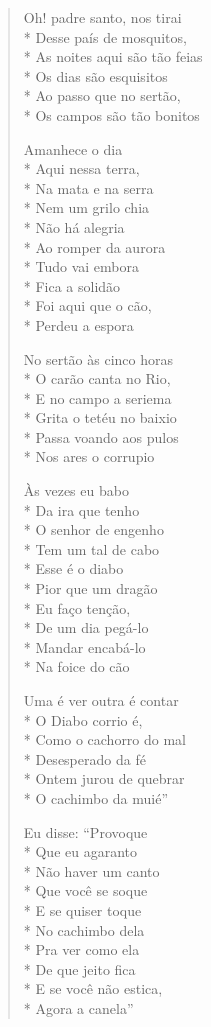 \begin{verse}
Oh! padre santo, nos tirai\\*
Desse país de mosquitos,\\*
As noites aqui são tão feias\\*
Os dias são esquisitos\\*
Ao passo que no sertão,\\*
Os campos são tão bonitos

Amanhece o dia\\*
Aqui nessa terra,\\*
Na mata e na serra\\*
Nem um grilo chia\\*
Não há alegria\\*
Ao romper da aurora\\*
Tudo vai embora\\*
Fica a solidão\\*
Foi aqui que o cão,\\*
Perdeu a espora

No sertão às cinco horas\\*
O carão canta no Rio,\\*
E no campo a seriema\\*
Grita o tetéu no baixio\\*
Passa voando aos pulos\\*
Nos ares o corrupio

Às vezes eu babo\\*
Da ira que tenho\\*
O senhor de engenho\\*
Tem um tal de cabo\\*
Esse é o diabo\\*
Pior que um dragão\\*
Eu faço tenção,\\*
De um dia pegá-lo\\*
Mandar encabá-lo\\*
Na foice do cão

Uma é ver outra é contar\\*
O Diabo corrio é,\\*
Como o cachorro do mal\\*
Desesperado da fé\\*
Ontem jurou de quebrar\\*
O cachimbo da muié''

Eu disse: ``Provoque\\*
Que eu agaranto\\*
Não haver um canto\\*
Que você se soque\\*
E se quiser toque\\*
No cachimbo dela\\*
Pra ver como ela\\*
De que jeito fica\\*
E se você não estica,\\*
Agora a canela''


\end{verse}
